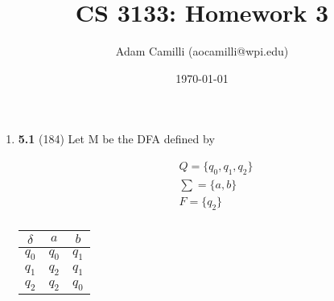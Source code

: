 \documentclass[12pt]{article}
\begin{document}
\title{CS 3133: Homework 3}
\author{Adam Camilli (aocamilli@wpi.edu)}
\date{\today}
\maketitle

\begin{enumerate}

\item \textbf{5.1} (184) Let M be the DFA defined by \\
  \begin{minipage}{0.5\textwidth}
    \begin{align*}
      &Q = \{q_0,q_1,q_2\} \\   
      &\sum = \{a,b\} \\
      &F = \{q_2\} \\
    \end{align*}
  \end{minipage}
  \begin{minipage}{.5\textwidth}
    \begin{tabular}{c|cc}
      $\delta$ & $a$ & $b$ \\
      \hline
      $q_0$ & $q_0$ & $q_1$ \\
      $q_1$ & $q_2$ & $q_1$ \\
      $q_2$ & $q_2$ & $q_0$ \\
    \end{tabular} \\
  \end{minipage}


\end{enumerate}
\end{document}
